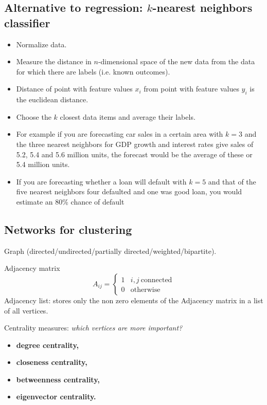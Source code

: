 \subsection{Alternative to regression: $k$-nearest neighbors classifier}

\begin{itemize}
    \item Normalize data.
    \item Measure the distance in $n$-dimensional space of the new data from the data for which there are labels (i.e. known outcomes).
    \item Distance of point with feature values $x_{i}$ from point with feature values $y_{i}$ is the euclidean distance.
    \item Choose the $k$ closest data items and average their labels.
    \item For example if you are forecasting car sales in a certain area with $k=3$ and the three nearest neighbors for GDP growth and interest rates give sales of 5.2, 5.4 and 5.6 million units, the forecast would be the average of these or 5.4 million units.
    \item If you are forecasting whether a loan will default with $k=5$ and that of the five nearest neighbors four defaulted and one was good loan, you would estimate an 80\% chance of default
\end{itemize}

\subsection{Networks for clustering}

Graph (directed/undirected/partially directed/weighted/bipartite).

Adjacency matrix
\begin{equation*}
    A_{ij} =
    \begin{cases}
        1 & i,j\ \text{connected} \\
        0 & \text{otherwise}      
    \end{cases}
\end{equation*}
Adjacency list: stores only the non zero elements of the Adjacency matrix in a list of all vertices.

Centrality measures: \textit{which vertices are more important?}
\begin{itemize}
    \item \textbf{degree centrality,}
    \item \textbf{closeness centrality,}
    \item \textbf{betweenness centrality,}
    \item \textbf{eigenvector centrality.}
\end{itemize}

